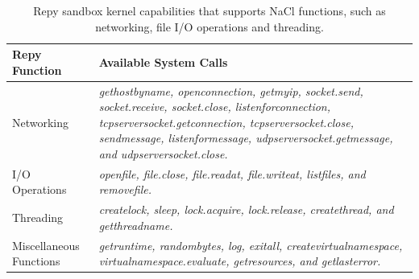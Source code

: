 \begin{table}
\centering
\caption {Repy sandbox kernel capabilities that supports NaCl functions, such as networking, file I/O operations and threading.}

  \begin{tabular}{ | p{2.5cm} | p{4.5cm} |}
  \hline
  \textbf{Repy Function} & \textbf{Available System Calls}  \\ \hline

Networking & \emph{gethostbyname, openconnection, getmyip, socket.send, socket.receive, socket.close,
listenforconnection, tcpserversocket.getconnection, tcpserversocket.close, sendmessage, listenformessage,
udpserversocket.getmessage, and udpserversocket.close.} \\ \hline

I/O Operations & \emph{openfile, file.close, file.readat, file.writeat, listfiles, and removefile.} \\ \hline

Threading & \emph{createlock, sleep, lock.acquire, lock.release, createthread, and getthreadname.} \\ \hline

Miscellaneous Functions & \emph{getruntime, randombytes, log, exitall, createvirtualnamespace,
virtualnamespace.evaluate, getresources, and getlasterror.}  \\ \hline
    \end{tabular}
    \label{table:RepyKernel}
\end{table}

